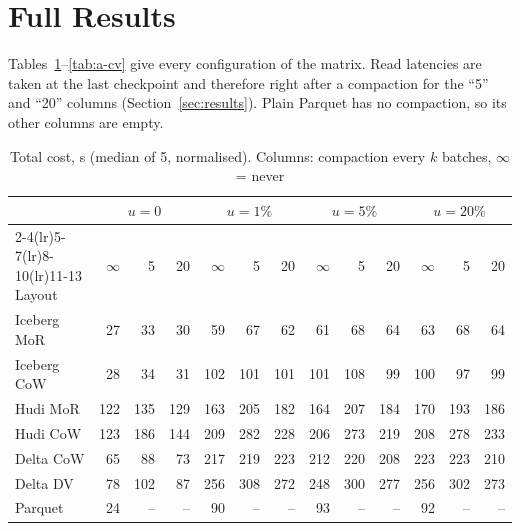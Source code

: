 \documentclass[conference]{IEEEtran}
\begin{document}
\appendices
\section{Full Results}
Tables~\ref{tab:a-total}--\ref{tab:a-cv} give every configuration of the matrix. Read latencies are taken at the last checkpoint and therefore
right after a compaction for the ``5'' and ``20'' columns (Section~\ref{sec:results}). Plain Parquet has no compaction, so its other columns are empty.

\begin{table}[!t]\centering
\caption{Total cost, s (median of 5, normalised). Columns: compaction every $k$ batches, $\infty$ = never}\label{tab:a-total}
\footnotesize
\begin{tabular}{@{}lrrrrrrrrrrrr@{}}\toprule
 & \multicolumn{3}{c}{$u=0$} & \multicolumn{3}{c}{$u=1\%$} & \multicolumn{3}{c}{$u=5\%$} & \multicolumn{3}{c}{$u=20\%$}\\
\cmidrule(lr){2-4}\cmidrule(lr){5-7}\cmidrule(lr){8-10}\cmidrule(lr){11-13}
Layout & $\infty$ & 5 & 20 & $\infty$ & 5 & 20 & $\infty$ & 5 & 20 & $\infty$ & 5 & 20\\\midrule
Iceberg MoR & 27 & 33 & 30 & 59 & 67 & 62 & 61 & 68 & 64 & 63 & 68 & 64\\
Iceberg CoW & 28 & 34 & 31 & 102 & 101 & 101 & 101 & 108 & 99 & 100 & 97 & 99\\
Hudi MoR & 122 & 135 & 129 & 163 & 205 & 182 & 164 & 207 & 184 & 170 & 193 & 186\\
Hudi CoW & 123 & 186 & 144 & 209 & 282 & 228 & 206 & 273 & 219 & 208 & 278 & 233\\
Delta CoW & 65 & 88 & 73 & 217 & 219 & 223 & 212 & 220 & 208 & 223 & 223 & 210\\
Delta DV & 78 & 102 & 87 & 256 & 308 & 272 & 248 & 300 & 277 & 256 & 302 & 273\\
Parquet & 24 & -- & -- & 90 & -- & -- & 93 & -- & -- & 92 & -- & --\\\bottomrule
\end{tabular}
\end{table}
\end{document}
